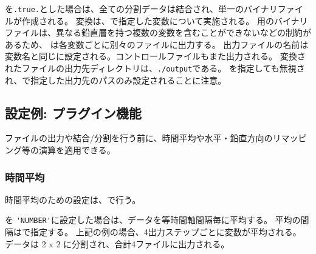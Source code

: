 を\verb|.true.|とした場合は、全ての分割データは結合され、単一のバイナリファイルが作成される。
変換は、で指定した変数について実施される。
\grads 用のバイナリファイルは、異なる鉛直層を持つ複数の変数を含むことができないなどの制約があるため、
\sno は各変数ごとに別々のファイルに出力する。
出力ファイルの名前は変数名と同じに設定される。コントロールファイルもまた出力される。
変換されたファイルの出力先ディレクトリは、\verb|./output|である。
を指定しても無視され、で指定した出力先のパスのみ設定されることに注意。




\subsection{設定例: プラグイン機能}

ファイルの出力や結合/分割を行う前に、時間平均や水平・鉛直方向のリマッピング等の演算を適用できる。

\subsubsection{時間平均}

時間平均のための設定は、で行う。
%


を \verb|'NUMBER'|に設定した場合は、データを等時間軸間隔毎に平均する。
平均の間隔はで指定する。
上記の例の場合、4出力ステップごとに変数が平均される。
データは 2 x 2 に分割され、合計4ファイルに出力される。


